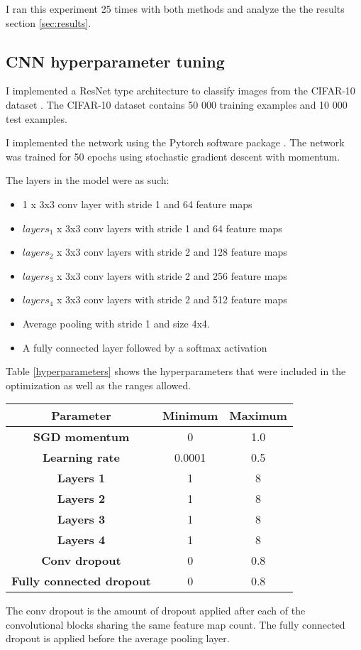 I ran this experiment 25 times with both methods and analyze the the results section \ref{sec:results}.

\subsection{CNN hyperparameter tuning}

I implemented a ResNet \citep{resnet} type architecture to classify images from the CIFAR-10 dataset \citep{cifar}. The CIFAR-10 dataset contains 50 000 training examples and 10 000 test examples.

I implemented the network using the Pytorch software package \citep{pytorch}. The network was trained for 50 epochs using stochastic gradient descent with momentum.

The layers in the model were as such:
\begin{itemize}
    \item 1 x 3x3 conv layer with stride 1 and 64 feature maps
    \item $layers_1$ x 3x3 conv layers with stride 1 and 64 feature maps
    \item $layers_2$ x 3x3 conv layers with stride 2 and 128 feature maps
    \item $layers_3$ x 3x3 conv layers with stride 2 and 256 feature maps
    \item $layers_4$ x 3x3 conv layers with stride 2 and 512 feature maps
    \item Average pooling with stride 1 and size 4x4.
    \item A fully connected layer followed by a softmax activation
\end{itemize}
\vfill

Table \ref{hyperparameters} shows the hyperparameters that were included in the optimization as well as the ranges allowed.

\begin{center}
    \begin{tabular}{ c | c | c }
    \bf{Parameter} & \bf{Minimum} & \bf{Maximum} \\
    \hline
    \bf{SGD momentum} & 0 & 1.0 \\
    \bf{Learning rate} & 0.0001 & 0.5 \\
    \bf{Layers 1} & 1 & 8 \\
    \bf{Layers 2} & 1 & 8 \\
    \bf{Layers 3} & 1 & 8 \\
    \bf{Layers 4} & 1 & 8 \\
    \bf{Conv dropout} & 0 & 0.8 \\
    \bf{Fully connected dropout} & 0 & 0.8 \\
    \end{tabular}
    \label{hyperparameters}
\end{center}

The conv dropout is the amount of dropout applied after each of the convolutional blocks sharing the same feature map count. The fully connected dropout is applied before the average pooling layer.


